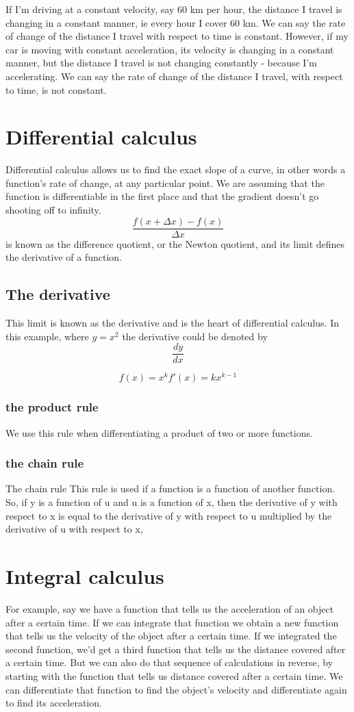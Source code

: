 If I'm driving at a constant velocity, say 60 km per hour, the distance I travel is changing in a constant manner, ie every hour I cover 60 km. We can say the rate of change of the distance I travel with respect to time is constant. However, if my car is moving with constant acceleration, its velocity is changing in a constant manner, but the distance I travel is not changing constantly - because I'm accelerating. We can say the rate of change of the distance I travel, with respect to time, is not constant.

\section{Differential calculus}
Differential calculus allows us to find the exact slope of a curve, in other words a function's rate of change, at any particular point. We are assuming that the function is differentiable in the first place and that the gradient doesn't go shooting off to infinity.
\[
\frac{f(x + \Delta x) - f(x)}{\Delta x}
\]
is known as the difference quotient, or the Newton quotient, and its limit defines the derivative of a function.


\subsection{The derivative}
This limit is known as the derivative and is the heart of differential calculus. In this example, where $y = x^2$ the derivative could be denoted by
\[
\frac{dy}{dx}
\]

\[
f(x) = x^k 
f'(x) = kx^{k-1}
\]

\subsubsection{the product rule}
We use this rule when differentiating a product of two or more functions.

\subsubsection{the chain rule}
The chain rule This rule is used if a function is a function of another function. So, if y is a function of u and u is a function of x, then the derivative of y with respect to x is equal to the derivative of y with respect to u multiplied by the derivative of u with respect to x,

\section{Integral calculus}
For example, say we have a function that tells us the acceleration of an object after a certain time. If we can integrate that function we obtain a new function that tells us the velocity of the object after a certain time. If we integrated the second function, we'd get a third function that tells us the distance covered after a certain time. But we can also do that sequence of calculations in reverse, by starting with the function that tells us distance covered after a certain time. We can differentiate that function to find the object's velocity and differentiate again to find its acceleration.

